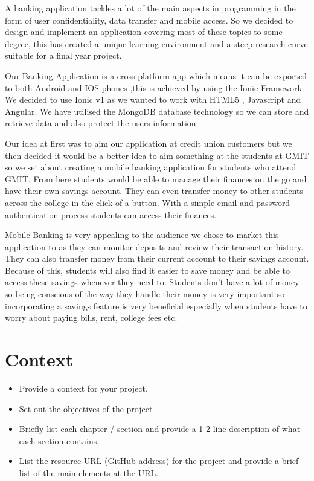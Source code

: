 A banking application tackles a lot of the main aspects in programming in the form of user
confidentiality, data transfer and mobile access. So we decided to design and implement an application covering most of these topics to some degree,  this has created a unique learning environment and a steep research curve suitable for a final year project.

	Our Banking Application is a cross platform app which means it can be exported to both
Android and IOS phones ,this is achieved by using the Ionic Framework. We decided to use Ionic v1 as we wanted to work with HTML5 , Javascript and Angular. We have utilised the  MongoDB database technology so we can store and retrieve data and also protect the users information.

Our idea at first was to aim our application at credit union customers but we then decided it would be a better idea to aim something at the students at GMIT so we set about creating a mobile banking application for students who attend GMIT. From here students would be able to manage their finances on the go and have their own savings account. They can even transfer money to other students across the college in the click of a button. With a simple email and password authentication process students can access their finances.

Mobile Banking is very appealing to the audience we chose to market this application to as they can monitor deposits and review their transaction history. They can also transfer money from their current account to their savings account. Because of this, students will also find it easier to save money and be able to access these savings whenever they need to. Students don’t have a lot of money so being conscious of the way they handle their money is very important so incorporating a savings feature is very beneficial especially when students have to worry about paying bills, rent, college fees etc.




\chapter{Context}
\begin{itemize}
\item Provide a context for your project.
\item Set out the objectives of the project
\item Briefly list each chapter / section and provide a 1-2 line description of what each section contains.
\item List the resource URL (GitHub address) for the project and provide a brief list of the main elements at the URL.

\end{itemize}

